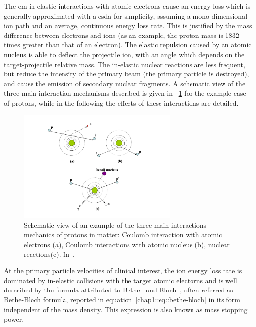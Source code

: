 The \gls{em} in-elastic interactions with atomic electrons cause an energy loss which is generally approximated with a \gls{csda} for simplicity, assuming a mono-dimensional ion path and an average, continuous energy loss rate. This is justified by the mass difference between electrons and ions (as an example, the proton mass is 1832 times greater than that of an electron). The elastic repulsion caused by an atomic nucleus is able to deflect the projectile ion, with an angle which depends on the target-projectile relative mass. The in-elastic nuclear reactions are less frequent, but reduce the intensity of the primary beam (the primary particle is destroyed), and cause the emission of secondary nuclear fragments. A schematic view of the three main interaction mechanisms described is given in \figurename~\ref{chap1::fig::protInteractions} for the example case of protons, while in the following the effects of these interactions are detailed.   

\begin{figure}[!htbp]
\centering
\includegraphics[width=0.7\textwidth]{03_GraphicFiles/chapter1_Introduction/protonInteractions.pdf}
\caption{Schematic view of an example of the three main interactions mechanics of protons in matter: Coulomb interaction with atomic electrons (a), Coulomb interactions with atomic nucleus (b), nuclear reactions(c). In~\cite{Newhauser2015}.}
\label{chap1::fig::protInteractions}
\end{figure} 

At the primary particle velocities of clinical interest,   the ion energy loss rate is dominated by in-elastic collisions with the target atomic electorns and is well described by the formula attributed to Bethe~\parencite{Bethe1930} and Bloch~\parencite{Bloch1933}, often referred as Bethe-Bloch formula, reported in equation~\ref{chap1::eq::bethe-bloch} in its form independent of the mass density. This expression is also known as mass stopping power.

